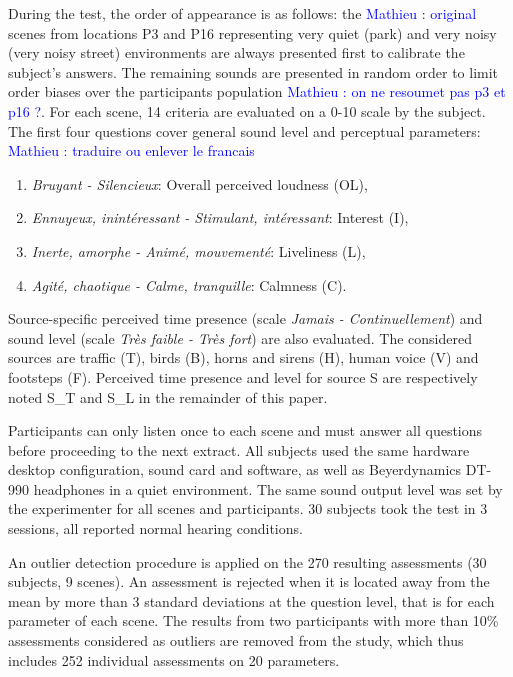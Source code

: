 \documentclass{article}
\newcommand{\ml}[1]{\textcolor{blue}{ Mathieu : #1}}
\begin{document}
\begin{sloppy}
During the test, the order of appearance is as follows: the \ml{original} scenes from locations P3 and P16 representing very quiet (park) and very noisy (very noisy street) environments are always presented first to calibrate the subject's answers. The remaining sounds are presented in random order to limit order biases over the participants population \ml{on ne resoumet pas p3 et p16 ?}. For each scene, 14 criteria are evaluated on a 0-10 scale by the subject. The first four questions cover general sound level and perceptual parameters: \ml{traduire ou enlever le francais}
\begin{enumerate}
\item \textit{Bruyant - Silencieux}: Overall perceived loudness (OL),
\item \textit{Ennuyeux, inint\'eressant - Stimulant, int\'eressant}: Interest (I),
\item \textit{Inerte, amorphe - Anim\'e, mouvement\'e}: Liveliness (L),
\item \textit{Agit\'e, chaotique - Calme, tranquille}: Calmness (C).
\end{enumerate}
Source-specific perceived time presence (scale \textit{Jamais - Continuellement}) and sound level (scale \textit{Tr\`es faible - Tr\`es fort}) are also evaluated. The considered sources are traffic (T), birds (B), horns and sirens (H), human voice (V) and footsteps (F). Perceived time presence and level for source S are respectively noted S\_T and S\_L in the remainder of this paper.

Participants can only listen once to each scene and must answer all questions before proceeding to the next extract. All subjects used the same hardware desktop configuration, sound card and software, as well as Beyerdynamics DT-990 headphones in a quiet environment. The same sound output level was set by the experimenter for all scenes and participants. 30 subjects took the test in 3 sessions, all reported normal hearing conditions.

An outlier detection procedure is applied on the 270 resulting assessments (30 subjects, 9 scenes). An assessment is rejected when it is located away from the mean by more than 3 standard deviations at the question level, that is for each parameter of each scene. The results from two participants with more than 10\% assessments considered as outliers are removed from the study, which thus includes 252 individual assessments on 20 parameters.


\end{sloppy}
\end{document}
